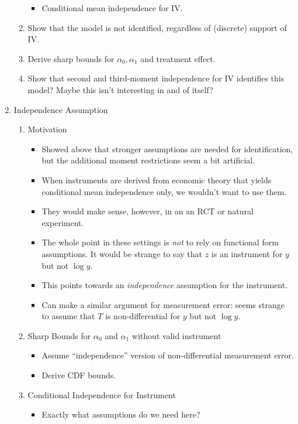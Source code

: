\documentclass[12pt]{article}
\begin{document}
\begin{enumerate}
\begin{enumerate}
\begin{itemize}
          \item Conditional mean independence for IV.
        \end{itemize}
      \item Show that the model is not identified, regardless of (discrete) support of IV.
      \item Derive sharp bounds for $\alpha_0, \alpha_1$ and treatment effect.
      \item Show that second and third-moment independence for IV identifies this model? Maybe this isn't interesting in and of itself?
    \end{enumerate}
  \item Independence Assumption
    \begin{enumerate}
      \item Motivation
    \begin{itemize}
      \item Showed above that stronger assumptions are needed for identification, but the additional moment restrictions seem a bit artificial.
      \item When instruments are derived from economic theory that yields conditional mean independence only, we wouldn't want to use them.
      \item They would make sense, however, in an an RCT or natural experiment.
      \item The whole point in these settings is \emph{not} to rely on functional form assumptions. It would be strange to say that $z$ is an instrument for $y$ but not $\log y$.
      \item This points towards an \emph{independence} assumption for the instrument.
      \item Can make a similar argument for measurement error: seems strange to assume that $T$ is non-differential for $y$ but not $\log y$.
    \end{itemize}
      \item Sharp Bounds for $\alpha_0$ and $\alpha_1$ without valid instrument  
        \begin{itemize}
          \item Assume ``independence'' version of non-differential measurement error.
          \item Derive CDF bounds.
        \end{itemize}
      \item Conditional Independence for Instrument
        \begin{itemize}
          \item Exactly what assumptions do we need here? 

\end{itemize}
\end{enumerate}
\end{enumerate}
\end{document}
